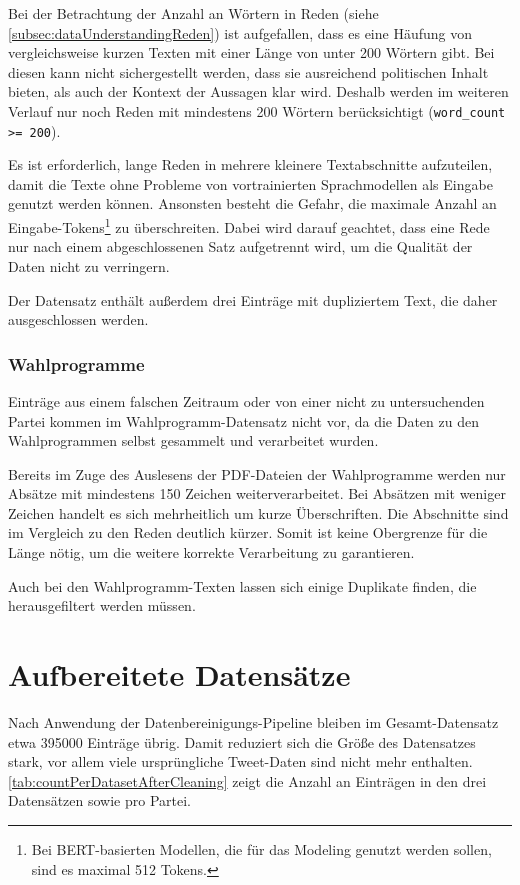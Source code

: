 Bei der Betrachtung der Anzahl an Wörtern in Reden (siehe \autoref{subsec:dataUnderstandingReden}) ist aufgefallen, dass es eine Häufung von vergleichsweise kurzen Texten mit einer Länge von unter \num{200} Wörtern gibt. Bei diesen kann nicht sichergestellt werden, dass sie ausreichend politischen Inhalt bieten, als auch der Kontext der Aussagen klar wird. Deshalb werden im weiteren Verlauf nur noch Reden mit mindestens 200 Wörtern berücksichtigt (\texttt{word\_count >= 200}).

Es ist erforderlich, lange Reden in mehrere kleinere Textabschnitte aufzuteilen, damit die Texte ohne Probleme von vortrainierten Sprachmodellen als Eingabe genutzt werden können. Ansonsten besteht die Gefahr, die maximale Anzahl an Eingabe-Tokens\footnote{Bei BERT-basierten Modellen, die für das Modeling genutzt werden sollen, sind es maximal \num{512} Tokens.} zu überschreiten. Dabei wird darauf geachtet, dass eine Rede nur nach einem abgeschlossenen Satz aufgetrennt wird, um die Qualität der Daten nicht zu verringern.

Der Datensatz enthält außerdem drei Einträge mit dupliziertem Text, die daher ausgeschlossen werden.

\subsubsection*{Wahlprogramme}
Einträge aus einem falschen Zeitraum oder von einer nicht zu untersuchenden Partei kommen im Wahlprogramm-Datensatz nicht vor, da die Daten zu den Wahlprogrammen selbst gesammelt und verarbeitet wurden.

Bereits im Zuge des Auslesens der \ac{PDF}-Dateien der Wahlprogramme werden nur Absätze mit mindestens \num{150} Zeichen weiterverarbeitet. Bei Absätzen mit weniger Zeichen handelt es sich mehrheitlich um kurze Überschriften. Die Abschnitte sind im Vergleich zu den Reden deutlich kürzer. Somit ist keine Obergrenze für die Länge nötig, um die weitere korrekte Verarbeitung zu garantieren.

Auch bei den Wahlprogramm-Texten lassen sich einige Duplikate finden, die herausgefiltert werden müssen.


\section{Aufbereitete Datensätze} \label{sec:processedDataframes}

Nach Anwendung der Datenbereinigungs-Pipeline bleiben im Gesamt-Datensatz etwa \num{395000} Einträge übrig. Damit reduziert sich die Größe des Datensatzes stark, vor allem viele ursprüngliche Tweet-Daten sind nicht mehr enthalten. \autoref{tab:countPerDatasetAfterCleaning} zeigt die Anzahl an Einträgen in den drei Datensätzen sowie pro Partei.

